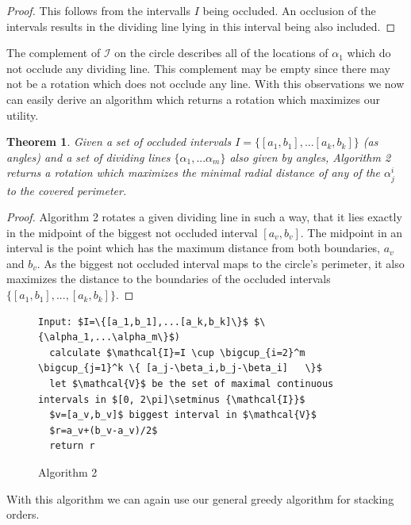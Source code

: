\documentclass[a4paper,11pt]{article}
\newtheorem{theorem}{Theorem}
\begin{document}
\begin{proof}
  This follows from the intervalls $I$ being occluded. An occlusion of the intervals results in the dividing line lying in this interval being also included.
\end{proof}

The complement of $\mathcal{I}$ on the circle describes all of the locations of $\alpha_1$ which do not occlude any dividing line. This complement may be empty since there may not be a rotation which does not occlude any line. With this observations we now can easily derive an algorithm which returns a rotation which maximizes our utility.

\begin{theorem}
  Given a set of occluded intervals $I=\{[a_1,b_1],...[a_k,b_k]\}$ (as angles) and a set of dividing lines $\{\alpha_1,...\alpha_m\}$ also given by angles, Algorithm 2 returns a rotation which maximizes the minimal radial distance of any of the $\alpha^i_j$ to the covered perimeter.
\end{theorem}

\begin{proof}
  Algorithm 2 rotates a given dividing line in such a way, that it lies exactly in the midpoint of the biggest not occluded interval $[a_v, b_v]$. The midpoint in an interval is the point which has the maximum distance from both boundaries, $a_v$ and $b_v$. As the biggest not occluded interval maps to the circle's perimeter, it also maximizes the distance to the boundaries of the occluded intervals $\{[a_1, b_1], ..., [a_k, b_k]\}$.
\end{proof}

\begin{figure}[!bth]
  \begin{lstlisting}[mathescape=true ]
Input: $I=\{[a_1,b_1],...[a_k,b_k]\}$ $\{\alpha_1,...\alpha_m\}$)
  calculate $\mathcal{I}=I \cup \bigcup_{i=2}^m    \bigcup_{j=1}^k \{ [a_j-\beta_i,b_j-\beta_i]   \}$
  let $\mathcal{V}$ be the set of maximal continuous intervals in $[0, 2\pi]\setminus {\mathcal{I}}$
  $v=[a_v,b_v]$ biggest interval in $\mathcal{V}$
  $r=a_v+(b_v-a_v)/2$
  return r
  \end{lstlisting}
  \caption{Algorithm 2}
\end{figure}

With this algorithm we can again use our general greedy algorithm for stacking orders.\\
\end{document}
